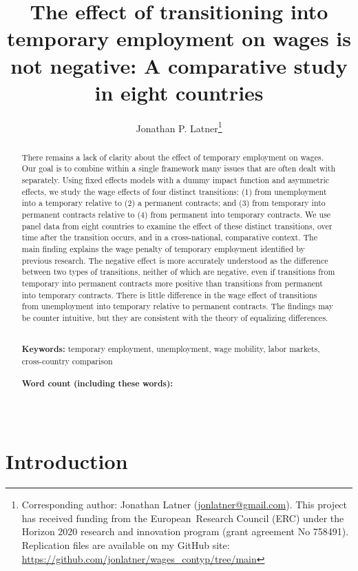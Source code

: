 \documentclass[12pt]{article}
\title{The effect of transitioning into temporary employment on wages is not negative: A comparative study in eight countries}
\author{Jonathan P. Latner\thanks{Corresponding author: Jonathan Latner (\url{jonlatner@gmail.com}).  This project has received funding from the European\ Research Council (ERC) under the Horizon 2020 research and innovation program (grant agreement No 758491).  Replication files are available on my GitHub site: \url{https://github.com/jonlatner/wages_contyp/tree/main}}}
\date{\vspace{-5ex}}
\newcommand\wordcount{}
\begin{document}
\maketitle

\begin{abstract}

\noindent 
There remains a lack of clarity about the effect of temporary employment on wages.  Our goal is to combine within a single framework many issues that are often dealt with separately.  Using fixed effects models with a dummy impact function and asymmetric effects, we study the wage effects of four distinct transitions: (1) from unemployment into a temporary relative to (2) a permanent contracts; and (3) from temporary into permanent contracts relative to (4) from permanent into temporary contracts.  We use panel data from eight countries to examine the effect of these distinct transitions, over time after the transition occurs, and in a cross-national, comparative context.  The main finding explains the wage penalty of temporary employment identified by previous research.  The negative effect is more accurately understood as the difference between two types of transitions, neither of which are negative, even if transitions from temporary into permanent contracts more positive than transitions from permanent into temporary contracts.  There is little difference in the wage effect of transitions from unemployment into temporary relative to permanent contracts. The findings may be counter intuitive, but they are consistent with the theory of equalizing differences.  

\noindent
\\
{\bf Keywords:} temporary employment, unemployment, wage mobility, labor markets, cross-country comparison \\
\\
{\bf Word count (including these words):} \wordcount

\noindent
\\

\end{abstract}

\doublespacing
\clearpage
\section{Introduction}
\end{document}
